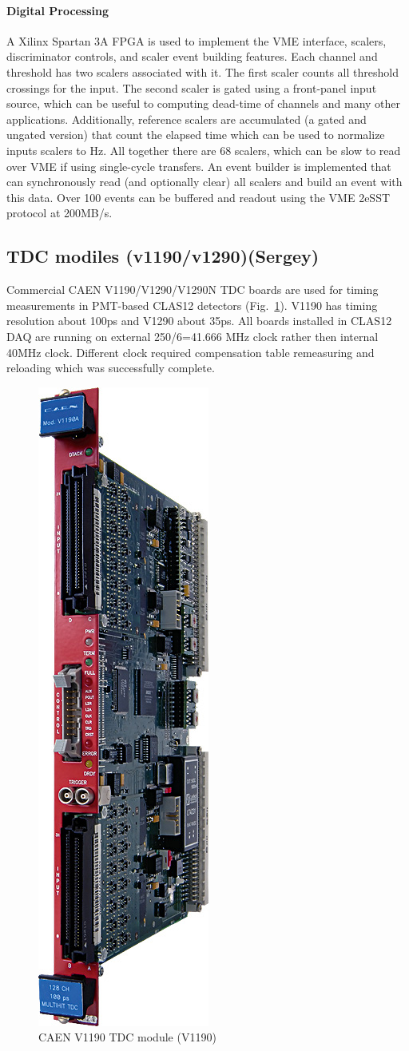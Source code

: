 \paragraph{Digital Processing}
A Xilinx Spartan 3A FPGA is used to implement the VME interface, scalers, discriminator controls, and scaler event building features. Each channel and threshold has two scalers associated with it. The first scaler counts all threshold crossings for the input. The second scaler is gated using a front-panel input source, which can be useful to computing dead-time of channels and many other applications. Additionally, reference scalers are accumulated (a gated and ungated version) that count the elapsed time which can be used to normalize inputs scalers to Hz. All together there are 68 scalers, which can be slow to read over VME if using single-cycle transfers. An event builder is implemented that can synchronously read (and optionally clear) all scalers and build an event with this data. Over 100 events can be buffered and readout using the VME 2eSST protocol at 200MB/s.


\subsection{TDC modiles (v1190/v1290)(Sergey)}

Commercial CAEN V1190/V1290/V1290N TDC boards are used for timing measurements in PMT-based CLAS12 detectors (Fig.~\ref{fig:v1190_board}). V1190 has timing resolution about 100ps and V1290 about 35ps. All boards installed in CLAS12 DAQ are running on external 250/6=41.666 MHz clock rather then internal 40MHz clock. Different clock required compensation table remeasuring and reloading which was successfully complete.

\begin{figure}[hbt]
	\centering
	\includegraphics[width=0.2\columnwidth,keepaspectratio]{img/v1190_board.jpg}
	\caption{CAEN V1190 TDC module (V1190)}
	\label{fig:v1190_board}
\end{figure}

